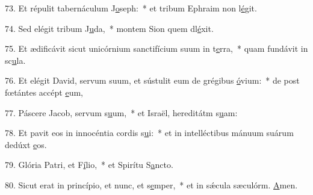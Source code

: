 73. Et répulit tabernáculum J\uline{o}seph:~* et tribum Ephraim non l\uline{é}git.\par 
74. Sed elégit tribum J\uline{u}da,~* montem Sion quem dl\uline{é}xit.\par 
75. Et ædificávit sicut unicórnium sanctifícium suum in t\uline{e}rra,~* quam fundávit in sc\uline{u}la.\par 
76. Et elégit David, servum suum, et sústulit eum de grégibus \uline{ó}vium:~* de post fœtántes accépt \uline{e}um,\par 
77. Páscere Jacob, servum s\uline{u}um,~* et Israël, hereditátm s\uline{u}am:\par 
78. Et pavit eos in innocéntia cordis s\uline{u}i:~* et in intelléctibus mánuum suárum dedúxt \uline{e}os.\par 
79. Glória Patri, et F\uline{í}lio,~* et Spirítu S\uline{a}ncto.\par 
80. Sicut erat in princípio, et nunc, et s\uline{e}mper,~* et in sǽcula sæculórm. \uline{A}men.\par 
